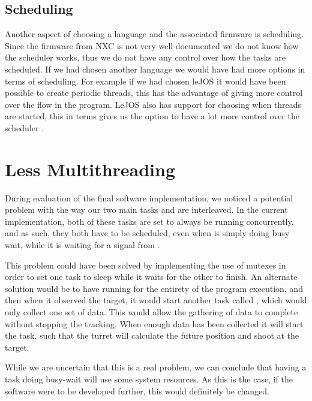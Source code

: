 \subsection{Scheduling}
Another aspect of choosing a language and the associated
firmware is scheduling. Since the firmware from NXC is not very well documented
we do not know how the scheduler works, thus we do not have any control over how
the tasks are scheduled. If we had chosen another language we would have had
more options in terms of scheduling. For example if we had chosen leJOS it would have
been possible to create periodic threads, this has the advantage of giving more
control over the flow in the program. LeJOS also has support for choosing when
threads are started, this in terms gives us the option to have a lot more
control over the scheduler \cite{lejosTimer}.


\section{Less Multithreading}

During evaluation of the final software implementation, we noticed a potential
problem with the way our two main tasks  and
 are interleaved. In the current implementation, both
of these tasks are set to always be running concurrently, and as such, they
both have to be scheduled, even when  is simply doing
busy wait, while it is waiting for a signal from .\nl

This problem could have been solved by implementing the use of mutexes in order
to set one task to sleep while it waits for the other to finish. An alternate
solution would be to have  running for the entirety of the program
execution, and then when it observed the target, it would start another task
called , which would only collect one set of data. This would
allow the gathering of data to complete without stopping the tracking. When
enough data has been collected it will start the  task, such
that the turret will calculate the future position and shoot at the target.\nl

While we are uncertain that this is a real problem, we can conclude that having
a task doing busy-wait will use some system resources. As this is the case, if
the \name software were to be developed further, this would definitely be
changed.
